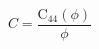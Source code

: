\begin{equation} \label{eq:C_equation}
C = \frac{\operatorname{C_{44}}\left(\phi\right)}{\phi}
\end{equation}
